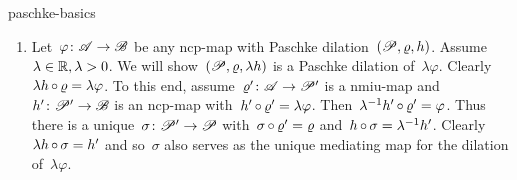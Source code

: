 \documentclass[b5page]{book}
\begin{document}
\begin{solution}{paschke-basics}
\begin{enumerate}
\item
Let~$\varphi\colon \mathscr{A} \to \mathscr{B}$ be any ncp-map
    with Paschke dilation~$(\mathscr{P}, \varrho, h)$.
Assume~$\lambda \in \mathbb{R}, \lambda > 0$.
We will show~$(\mathscr{P}, \varrho, \lambda h)$
    is a Paschke dilation of~$\lambda \varphi$.
Clearly~$\lambda h \mathop{\circ} \varrho = \lambda \varphi$.
To this end, assume~$\varrho'\colon \mathscr{A} \to \mathscr{P}'$ is a nmiu-map
    and~$h' \colon \mathscr{P}' \to \mathscr{B}$ is an ncp-map
    with~$h' \mathop{\circ} \varrho' = \lambda \varphi$.
Then~$\lambda^{-1} h' \mathop{\circ} \varrho' = \varphi $.
Thus there is a unique~$\sigma\colon \mathscr{P}' \to \mathscr{P}$
    with~$\sigma \mathop{\circ} \varrho' = \varrho$
    and~$h \mathop{\circ} \sigma = \lambda^{-1} h'$.
Clearly~$\lambda h \mathop{\circ} \sigma = h'$ and so~$\sigma$
    also serves as the unique mediating map
    for the dilation of~$\lambda \varphi$.
\end{enumerate}
\end{solution}
\spacingfix
\end{document}
